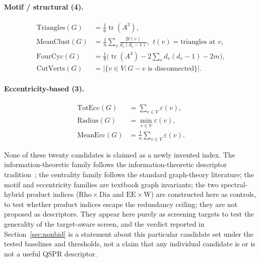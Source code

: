 \paragraph{Motif / structural (4).}
\begin{align*}
\mathrm{Triangles}(G) &= \tfrac{1}{6}\operatorname{tr}(A^3), \\
\mathrm{MeanClust}(G) &= \frac{1}{n}\sum_{v} \frac{2 t(v)}{d_v(d_v-1)},\ \,t(v) = \text{triangles at } v, \\
\mathrm{FourCyc}(G) &= \tfrac{1}{8}\bigl(\operatorname{tr}(A^4) - 2\!\sum_v d_v(d_v - 1) - 2m\bigr), \\
\mathrm{CutVerts}(G) &= |\{v \in V : G - v \text{ is disconnected}\}|.
\end{align*}

\paragraph{Eccentricity-based (3).}
\begin{align*}
\mathrm{TotEcc}(G) &= \sum_{v \in V} \varepsilon(v), \\
\mathrm{Radius}(G) &= \min_{v \in V} \varepsilon(v), \\
\mathrm{MeanEcc}(G) &= \frac{1}{n}\sum_{v \in V} \varepsilon(v).
\end{align*}

None of these twenty candidates is claimed as a newly invented
index. The information-theoretic family follows the information-theoretic descriptor tradition~\cite{TodeschiniConsonniHandbook};
the centrality family follows the standard graph-theory
literature; the motif and eccentricity families are textbook
graph invariants; the two spectral-hybrid product indices
($\mathrm{Rho}\times\mathrm{Dia}$ and $\mathrm{EE}\times\mathrm{W}$) are
constructed here as controls, to test whether product indices escape
the redundancy ceiling; they are not proposed as descriptors. They
appear here purely as screening targets to test the generality
of the target-aware screen, and the
verdict reported in Section~\ref{sec:nonbid} is a statement about
this particular candidate set under the tested baselines and
thresholds, not a claim that any individual candidate is or is
not a useful QSPR descriptor.



